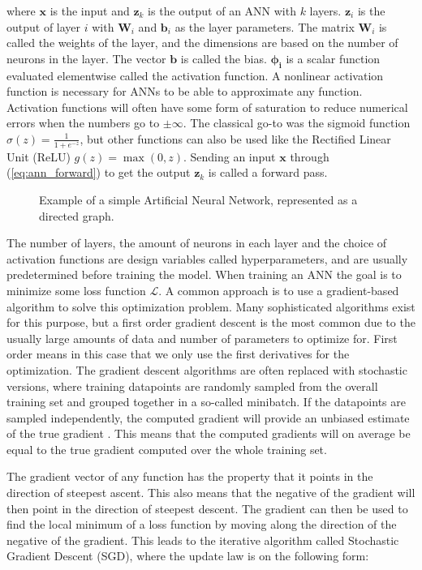 \documentclass[12pt,a4paper]{book}
\begin{document}
\noindent where $\bm{x}$ is the input and $\bm{z}_k$ is the output of an ANN with $k$ layers. $\bm{z}_i$ is the output of layer $i$ with $\bm{W}_i$ and $ \bm{b}_i$ as the layer parameters. The matrix $\bm{W}_i$ is called the weights of the layer, and the dimensions are based on the number of neurons in the layer. The vector $\bm{b}$ is called the bias. $\bm{\phi_i}$ is a scalar function evaluated elementwise called the activation function. A nonlinear activation function is necessary for ANNs to be able to approximate any function. Activation functions will often have some form of saturation to reduce numerical errors when the numbers go to $\pm \infty$. The classical go-to was the sigmoid function $\sigma(z) = \frac{1}{1 + e^{-z}}$, but other functions can also be used like the Rectified Linear Unit (ReLU) $g(z) = \max(0, z)$. Sending an input $\bm{x}$ through (\ref{eq:ann_forward}) to get the output $\bm{z}_k$ is called a forward pass.

\begin{figure}[H]
    \centering
    
    \caption{Example of a simple Artificial Neural Network, represented as a directed graph.}
    \label{fig:ann}
\end{figure}

The number of layers, the amount of neurons in each layer and the choice of activation functions are design variables called hyperparameters, and are usually predetermined before training the model. When training an ANN the goal is to minimize some loss function $\mathcal{L}$. A common approach is to use a gradient-based algorithm to solve this optimization problem. Many sophisticated algorithms exist for this purpose, but a first order gradient descent is the most common due to the usually large amounts of data and number of parameters to optimize for. First order means in this case that we only use the first derivatives for the optimization. The gradient descent algorithms are often replaced with stochastic versions, where training datapoints are randomly sampled from the overall training set and grouped together in a so-called minibatch. If the datapoints are sampled independently, the computed gradient will provide an unbiased estimate of the true gradient \citep{deeplearningbook}. This means that the computed gradients will on average be equal to the true gradient computed over the whole training set.

The gradient vector of any function has the property that it points in the direction of steepest ascent. This also means that the negative of the gradient will then point in the direction of steepest descent. The gradient can then be used to find the local minimum of a loss function by moving along the direction of the negative of the gradient. This leads to the iterative algorithm called Stochastic Gradient Descent (SGD), where the update law is on the following form:
\end{document}

